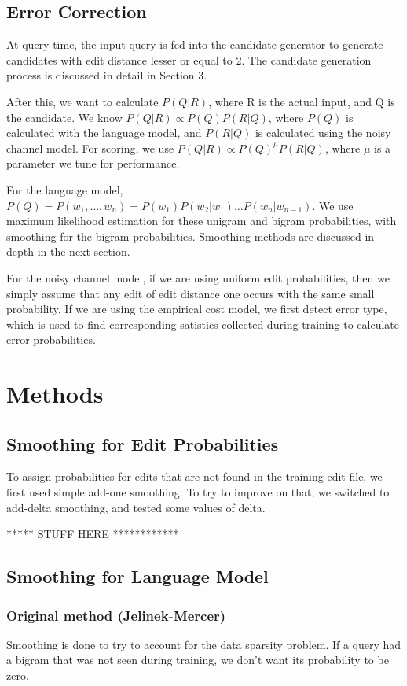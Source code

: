 \documentclass[10pt,twocolumn]{article}
\begin{document}
\subsection{Error Correction}
At query time, the input query is fed into the candidate generator to generate candidates with edit distance lesser or equal to 2. The candidate generation process is discussed in detail in Section 3.

After this, we want to calculate $P(Q|R)$, where R is the actual input, and Q is the candidate. We know $P(Q|R)\propto P(Q)P(R|Q)$, where $P(Q)$ is calculated with the language model, and $P(R|Q)$ is calculated using the noisy channel model. For scoring, we use $P(Q|R)\propto P(Q)^\mu P(R|Q)$, where $\mu$ is a parameter we tune for performance.

For the language model, $P(Q)=P(w_1,\dots,w_n)=P(w_1)P(w_2|w_1)\dots P(w_n|w_{n-1})$. We use maximum likelihood estimation for these unigram and bigram probabilities, with smoothing for the bigram probabilities. Smoothing methods are discussed in depth in the next section.

For the noisy channel model, if we are using uniform edit probabilities, then we simply assume that any edit of edit distance one occurs with the same small probability. If we are using the empirical cost model, we first detect error type, which is used to find corresponding satistics collected during training to calculate error probabilities.

\section{Methods}
\subsection{Smoothing for Edit Probabilities}
To assign probabilities for edits that are not found in the training edit file, we first used simple add-one smoothing. To try to improve on that, we switched to add-delta smoothing, and tested some values of delta.

***** STUFF HERE ************
\subsection{Smoothing for Language Model}
\subsubsection{Original method (Jelinek-Mercer)}
Smoothing is done to try to account for the data sparsity problem. If a query had a bigram that was not seen during training, we don't want its probability to be zero.
\end{document}
